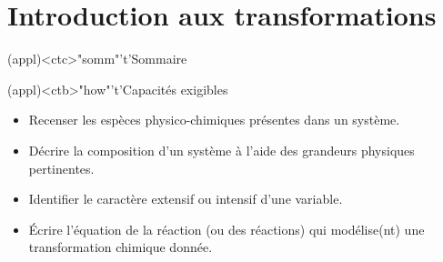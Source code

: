\documentclass[../../main/main.tex]{subfiles}
\begin{document}
\setcounter{chapter}{0}


\chapter{Introduction aux transformations}

\vspace*{\fill}

\begin{tcn}(appl)<ctc>"somm"'t'{Sommaire}
	\let\item\olditem
	\vspace{-15pt}
	\minitoc
	\vspace{-25pt}
\end{tcn}

\begin{tcn}[sidebyside](appl)<ctb>"how"'t'{Capacités exigibles}
	\begin{itemize}[label=\rcheck]
		\item Recenser les espèces physico-chimiques présentes
		      dans un système.
		\item Décrire la composition d’un système à l’aide des grandeurs physiques
		      pertinentes.
	\end{itemize}
	\tcblower
	\begin{itemize}[label=\rcheck]
		\item Identifier le caractère extensif ou intensif d’une
		      variable.
		\item Écrire l’équation de la réaction (ou des réactions) qui modélise(nt)
		      une transformation chimique donnée.
	\end{itemize}
\end{tcn}

\vspace*{\fill}
\newpage
\vspace*{\fill}
\end{document}
